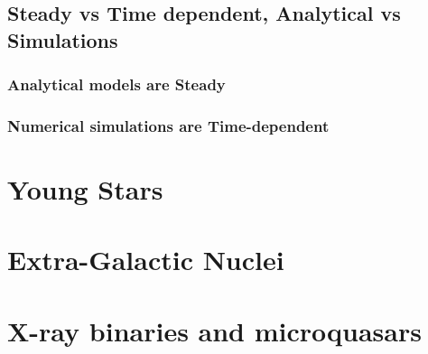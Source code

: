 \documentclass[10pt,a4paper,english]{article}
\begin{document}
\subsection{Steady vs Time dependent, Analytical vs Simulations}
\subsubsection{Analytical models are Steady}
\subsubsection{Numerical simulations are Time-dependent}

\section{Young Stars}
\section{Extra-Galactic Nuclei}
\section{X-ray binaries and microquasars}

\appendix

\makeatletter
\def\@seccntformat#1{Appendix~\csname the#1\endcsname:\quad}
\makeatother

\newpage



\end{document}
